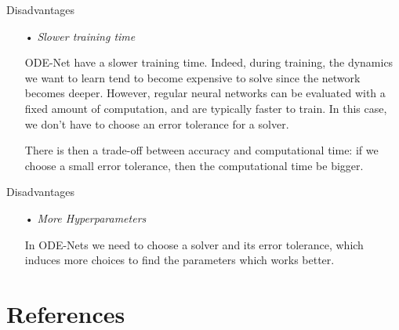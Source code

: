 \documentclass[11pt]{beamer}
\begin{document}
\begin{frame}{Disadvantages}
\begin{itemize}
\item[•] \textit{Slower training time}

ODE-Net have a slower training time. Indeed, during training, the dynamics we want to learn tend to become expensive to solve since the network becomes deeper. However, regular neural networks can be evaluated with a fixed amount of computation, and are typically faster to train. In this case, we don't have to choose an error tolerance for a solver.

There is then a trade-off between accuracy and computational time: if we choose a small error tolerance, then the computational time be bigger.
\end{itemize}
\end{frame}

\begin{frame}{Disadvantages}
\begin{itemize}
\item[•] \textit{More Hyperparameters}

In ODE-Nets we need to choose a solver and its error tolerance, which induces more choices to find the parameters which works better.
\end{itemize}
\end{frame}


\section{References}


\begin{frame}[allowframebreaks]

\nocite{*}



\end{frame}
\end{document}
